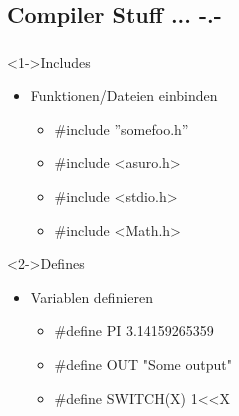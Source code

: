 \subsection{Compiler Stuff ... -.-}
\begin{frame}
	\frametitle{\currentsection}
	\framesubtitle{\currentsubsection}
	\begin{block}<1->{Includes}
		\begin{itemize}
			\item Funktionen/Dateien einbinden
			\begin{itemize}
				\item \#include ''somefoo.h''
				\item \#include <asuro.h>
				\item \#include <stdio.h>
				\item \#include <Math.h>
			\end{itemize}
		\end{itemize}
	\end{block}
	\begin{block}<2->{Defines}
		\begin{itemize}
			\item Variablen definieren
			\begin{itemize}
				\item \#define PI 3.14159265359
				\item \#define OUT "Some output"
				\item \#define SWITCH(X) 1<<X
			\end{itemize}
		\end{itemize}
	\end{block}
\end{frame}